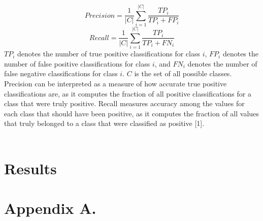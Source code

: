 \documentclass[twoside,11pt]{article}
\begin{document}
$$Precision = \frac{1}{|C|} \sum^{|C|}_{i=1} \frac{TP_i}{TP_i + FP_i}$$
$$Recall = \frac{1}{|C|} \sum^{|C|}_{i=1} \frac{TP_i}{TP_i + FN_i}$$
$TP_i$ denotes the number of true positive classifications for class $i$, $FP_i$ denotes the number of false positive classifications for class $i$, and $FN_i$ denotes the number of false negative classifications for class $i$. $C$ is the set of all possible classes. Precision can be interpreted as a measure of how accurate true positive classifications are, as it computes the fraction of all positive classifications for a class that were truly positive. Recall measures accuracy among the values for each class that should have been positive, as it computes the fraction of all values that truly belonged to a class that were classified as positive [1]. \\ \\


\section{Results}






\newpage

\appendix
\section*{Appendix A.}
\label{app:theorem}

\end{document}

